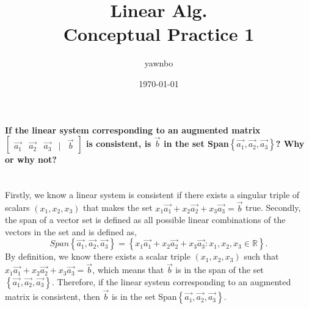 \documentclass{report}
\title{\Huge{Linear Alg.}\\ Conceptual Practice 1 }
\author{\huge{yawnbo}}
\date{\today}
\begin{document}
\maketitle

\pagebreak
\paragraph{If the linear system corresponding to an augmented matrix $ \begin{bmatrix} \vec{ a_1 }& \vec{ a_2 }& \vec{ a_3 } & \bigg| & \vec{ b } \end{bmatrix}  $ is consistent, is $ \vec{ b } $ in the set Span$ \left\{ \vec{ a_1 },\vec{ a_2 },\vec{ a_3 } \right\}  $? Why or why not? \\ \\}

Firstly, we know a linear system is consistent if there exists a singular triple of scalars $ \left( x_1, x_2, x_3 \right)  $ that makes the set $ x_1 \vec{ a_1 } + x_2 \vec{ a_2 }+ x_3 \vec{ a_3 } = \vec{ b } $ true. Secondly, the span of a vector set is defined as all possible linear combinations of the vectors in the set and is defined as,
\[
Span\left\{ \vec{ a_1 },\vec{ a_2 },\vec{ a_3 } \right\} = \left\{ x_1 \vec{ a_1 } + x_2 \vec{ a_2 }+ x_3 \vec{ a_3 } : x_1,x_2,x_3 \in \mathbb{R} \right\}
.\] 
By definition, we know there exists a scalar triple $ \left( x_1, x_2, x_3 \right)  $ such that $ x_1 \vec{ a_1 } + x_2 \vec{ a_2 }+ x_3 \vec{ a_3 } = \vec{ b } $, which means that $ \vec{ b } $ is in the span of the set $ \left\{ \vec{ a_1 },\vec{ a_2 },\vec{ a_3 } \right\}  $. Therefore, if the linear system corresponding to an augmented matrix is consistent, then $ \vec{ b } $ is in the set Span$ \left\{ \vec{ a_1 },\vec{ a_2 },\vec{ a_3 } \right\}  $.
\end{document}
